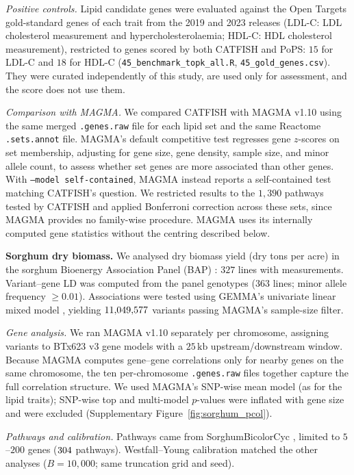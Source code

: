 \emph{Positive controls.} Lipid candidate genes were evaluated against the Open Targets gold-standard genes of each trait \citep{Mountjoy2021L2G} from the 2019 and 2023 releases (LDL-C: LDL cholesterol measurement and hypercholesterolaemia; HDL-C: HDL cholesterol measurement), restricted to genes scored by both CATFISH and PoPS: $15$ for LDL-C and $18$ for HDL-C (\texttt{45\_benchmark\_topk\_all.R}, \texttt{45\_gold\_genes.csv}). They were curated independently of this study, are used only for assessment, and the score does not use them.

\emph{Comparison with MAGMA.} We compared CATFISH with MAGMA v1.10 \citep{deLeeuw2015} using the same merged \texttt{.genes.raw} file for each lipid set and the same Reactome \texttt{.sets.annot} file. MAGMA’s default competitive test regresses gene $z$-scores on set membership, adjusting for gene size, gene density, sample size, and minor allele count, to assess whether set genes are more associated than other genes. With \texttt{--model self-contained}, MAGMA instead reports a self-contained test matching CATFISH’s question. We restricted results to the $1{,}390$ pathways tested by CATFISH and applied Bonferroni correction across these sets, since MAGMA provides no family-wise procedure. MAGMA uses its internally computed gene statistics without the centring described below.

\textbf{Sorghum dry biomass.} We analysed dry biomass yield (dry tons per acre) in the sorghum Bioenergy Association Panel (BAP) \citep{Brenton2016}: $327$ lines with measurements. Variant--gene LD was computed from the panel genotypes ($363$ lines; minor allele frequency $\ge0.01$). Associations were tested using GEMMA’s univariate linear mixed model \citep{Zhou2012GEMMA}, yielding $11{,}049{,}577$ variants passing MAGMA’s sample-size filter.

\emph{Gene analysis.} We ran MAGMA v1.10 \citep{deLeeuw2015} separately per chromosome, assigning variants to BTx623 v3 gene models with a $25\,\mathrm{kb}$ upstream/downstream window. Because MAGMA computes gene--gene correlations only for nearby genes on the same chromosome, the ten per-chromosome \texttt{.genes.raw} files together capture the full correlation structure. We used MAGMA’s SNP-wise mean model (as for the lipid traits); SNP-wise top and multi-model $p$-values were inflated with gene size and were excluded (Supplementary Figure~\ref{fig:sorghum_pcol}).

\emph{Pathways and calibration.} Pathways came from SorghumBicolorCyc \citep{Hawkins2021CornCyc}, limited to $5$--$200$ genes ($304$ pathways). Westfall--Young calibration matched the other analyses ($B=10{,}000$; same truncation grid and seed).

